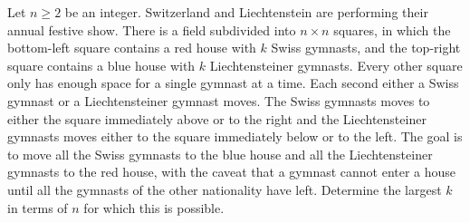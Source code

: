 Let $n\geq 2$ be an integer. Switzerland and Liechtenstein are performing their annual festive show.
There is a field subdivided into $n \times n$ squares,
in which the bottom-left square contains a red house with $k$ Swiss gymnasts,
and the top-right square contains a blue house with $k$ Liechtensteiner gymnasts.
Every other square only has enough space for a single gymnast at a time.
Each second either a Swiss gymnast or a Liechtensteiner gymnast moves.
The Swiss gymnasts moves to either the square immediately above or to the right
and the Liechtensteiner gymnasts moves either to the square immediately below or to the left.
The goal is to move all the Swiss gymnasts to the blue house
and all the Liechtensteiner gymnasts to the red house,
with the caveat that a gymnast cannot enter a house until all the gymnasts of the other nationality have left.
Determine the largest $k$ in terms of $n$ for which this is possible.

